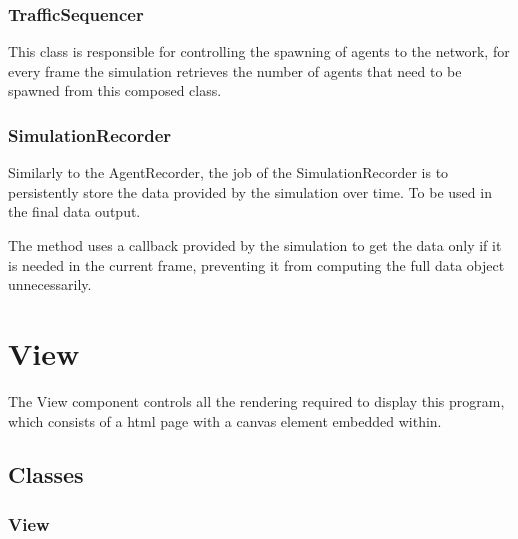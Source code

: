         \subsubsection{TrafficSequencer}

            This class is responsible for controlling the spawning of agents to the network, for every frame the simulation retrieves the number of agents that need to be spawned from this composed class.


        \subsubsection{SimulationRecorder}

            Similarly to the AgentRecorder, the job of the SimulationRecorder is to persistently store the data provided by the simulation over time. To be used in the final data output.

            The  method uses a callback provided by the simulation to get the data only if it is needed in the current frame, preventing it from computing the full data object unnecessarily.



\section{View}

    The View component controls all the rendering required to display this program, which consists of a html page with a canvas element embedded within.

    \subsection{Classes}

        \subsubsection{View}

